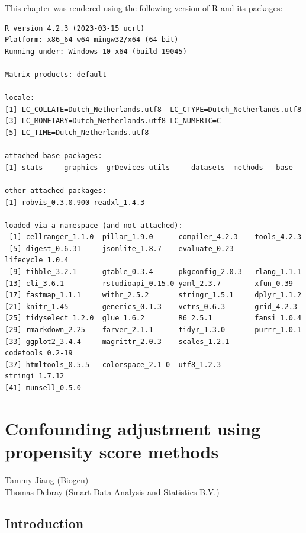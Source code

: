 \documentclass[
  letterpaper,
  DIV=11,
  numbers=noendperiod]{scrreprt}
\begin{document}

This chapter was rendered using the following version of R and its
packages:

\begin{verbatim}
R version 4.2.3 (2023-03-15 ucrt)
Platform: x86_64-w64-mingw32/x64 (64-bit)
Running under: Windows 10 x64 (build 19045)

Matrix products: default

locale:
[1] LC_COLLATE=Dutch_Netherlands.utf8  LC_CTYPE=Dutch_Netherlands.utf8   
[3] LC_MONETARY=Dutch_Netherlands.utf8 LC_NUMERIC=C                      
[5] LC_TIME=Dutch_Netherlands.utf8    

attached base packages:
[1] stats     graphics  grDevices utils     datasets  methods   base     

other attached packages:
[1] robvis_0.3.0.900 readxl_1.4.3    

loaded via a namespace (and not attached):
 [1] cellranger_1.1.0  pillar_1.9.0      compiler_4.2.3    tools_4.2.3      
 [5] digest_0.6.31     jsonlite_1.8.7    evaluate_0.23     lifecycle_1.0.4  
 [9] tibble_3.2.1      gtable_0.3.4      pkgconfig_2.0.3   rlang_1.1.1      
[13] cli_3.6.1         rstudioapi_0.15.0 yaml_2.3.7        xfun_0.39        
[17] fastmap_1.1.1     withr_2.5.2       stringr_1.5.1     dplyr_1.1.2      
[21] knitr_1.45        generics_0.1.3    vctrs_0.6.3       grid_4.2.3       
[25] tidyselect_1.2.0  glue_1.6.2        R6_2.5.1          fansi_1.0.4      
[29] rmarkdown_2.25    farver_2.1.1      tidyr_1.3.0       purrr_1.0.1      
[33] ggplot2_3.4.4     magrittr_2.0.3    scales_1.2.1      codetools_0.2-19 
[37] htmltools_0.5.5   colorspace_2.1-0  utf8_1.2.3        stringi_1.7.12   
[41] munsell_0.5.0    
\end{verbatim}


\hypertarget{confounding-adjustment-using-propensity-score-methods}{%
\chapter{Confounding adjustment using propensity score
methods}\label{confounding-adjustment-using-propensity-score-methods}}

Tammy Jiang (Biogen)\\
Thomas Debray (Smart Data Analysis and Statistics B.V.)

\hfill\break

\hypertarget{introduction}{%
\section{Introduction}\label{introduction}}
\end{document}
